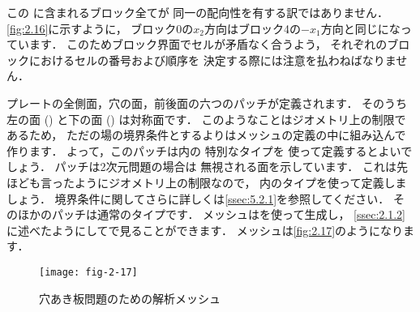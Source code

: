 この
%
%
に含まれるブロック全てが
同一の配向性を有する訳ではありません．
\autoref{fig:2.16}に示すように，
ブロック0の$x_{2}$方向はブロック4の$-x_{1}$方向と同じになっています．
このためブロック界面でセルが矛盾なく合うよう，
それぞれのブロックにおけるセルの番号および順序を
決定する際には注意を払わねばなりません．

プレートの全側面，穴の面，前後面の六つのパッチが定義されます．
そのうち左の面 () と下の面 () は対称面です．
このようなことはジオメトリ上の制限であるため，
ただの場の境界条件とするよりはメッシュの定義の中に組み込んで作ります．
よって，このパッチは内の
特別なタイプを
使って定義するとよいでしょう．
パッチは2次元問題の場合は
無視される面を示しています．
これは先ほども言ったようにジオメトリ上の制限なので，
内のタイプを使って定義しましょう．
境界条件に関してさらに詳しくは\autoref{ssec:5.2.1}を参照してください．
そのほかのパッチは通常のタイプです．
メッシュはを使って生成し，
\autoref{ssec:2.1.2}に述べたようにしてで見ることができます．
メッシュは\autoref{fig:2.17}のようになります．


\begin{figure}[ht]
 \texttt{[image: fig-2-17]}
 \caption{穴あき板問題のための解析メッシュ}
 \label{fig:2.17}
\end{figure}


